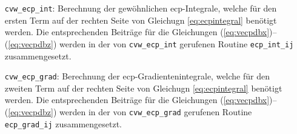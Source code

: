 	\begin{itemize}[leftmargin=77pt]
	\item[\texttt{cvw\_ecp\_int}:] Berechnung der gewöhnlichen \ac{ecp}-Integrale, welche für den ersten Term auf der rechten Seite von Gleichugn \ref{eq:ecpintegral} benötigt werden. Die entsprechenden Beiträge für die Gleichungen (\ref{eq:vecpdbx})--(\ref{eq:vecpdbz}) werden in der von \texttt{cvw\_ecp\_int} gerufenen Routine \texttt{ecp\_int\_ij} zusammengesetzt.
	\item[\texttt{cvw\_ecp\_grad}:] Berechnung der \ac{ecp}-Gradientenintegrale, welche für den zweiten Term auf der rechten Seite von Gleichugn \ref{eq:ecpintegral} benötigt werden. Die entsprechenden Beiträge für die Gleichungen (\ref{eq:vecpdbx})--(\ref{eq:vecpdbz}) werden in der von \texttt{cvw\_ecp\_grad} gerufenen Routine \texttt{ecp\_grad\_ij} zusammengesetzt.
	\end{itemize} 
\newpage	

